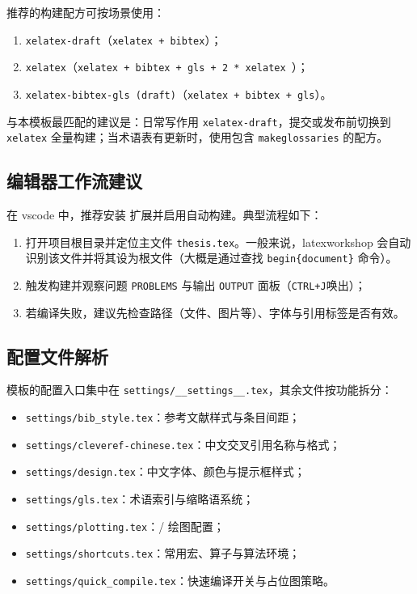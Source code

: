 推荐的构建配方可按场景使用：
\begin{mynotice}
\begin{enumerate}
  \item \texttt{xelatex-draft}（\texttt{xelatex + bibtex}）；
  \item \texttt{xelatex}（\texttt{xelatex + bibtex + gls + 2 * xelatex }）；
  \item \texttt{xelatex-bibtex-gls (draft)}（\texttt{xelatex + bibtex + gls}）。
\end{enumerate}
\end{mynotice}

与本模板最匹配的建议是：日常写作用 \texttt{xelatex-draft}，提交或发布前切换到 \texttt{xelatex} 全量构建；当术语表有更新时，使用包含 \texttt{makeglossaries} 的配方。

\subsection{编辑器工作流建议}

在 \gls{vscode} 中，推荐安装  扩展并启用自动构建。典型流程如下：
\begin{enumerate}
  \item 打开项目根目录并定位主文件 \texttt{thesis.tex}。一般来说，\gls{latexworkshop} 会自动识别该文件并将其设为根文件（大概是通过查找 \texttt{begin\{document\}} 命令）。
  \item 触发构建并观察问题 \texttt{PROBLEMS} 与输出 \texttt{OUTPUT} 面板（\texttt{CTRL+J}唤出）；
  \item 若编译失败，建议先检查路径（文件、图片等）、字体与引用标签是否有效。
\end{enumerate}

\subsection{配置文件解析}

模板的配置入口集中在 \texttt{settings/\_\_settings\_\_.tex}，其余文件按功能拆分：
\begin{itemize}
  \item \texttt{settings/bib\_style.tex}：参考文献样式与条目间距；
  \item \texttt{settings/cleveref-chinese.tex}：中文交叉引用名称与格式；
  \item \texttt{settings/design.tex}：中文字体、颜色与提示框样式；
  \item \texttt{settings/gls.tex}：术语索引与缩略语系统；
  \item \texttt{settings/plotting.tex}：/ 绘图配置；
  \item \texttt{settings/shortcuts.tex}：常用宏、算子与算法环境；
  \item \texttt{settings/quick\_compile.tex}：快速编译开关与占位图策略。
\end{itemize}

